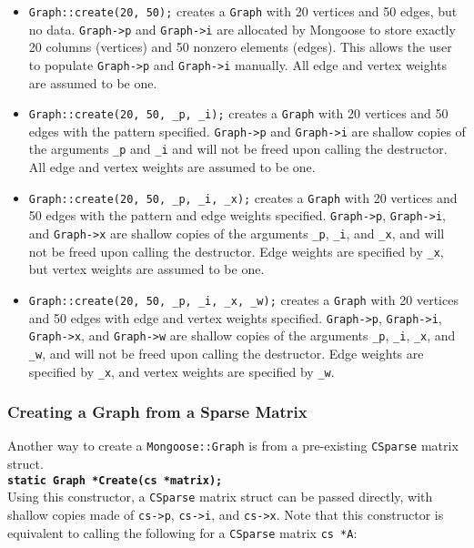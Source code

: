 \documentclass[letter]{article}
\begin{document}
\begin{itemize}
\item \texttt{Graph::create(20, 50);} creates a \texttt{Graph} with 20 vertices and 50 edges, but no data. \texttt{Graph->p} and \texttt{Graph->i} are allocated by Mongoose to store exactly 20 columns (vertices) and 50 nonzero elements (edges). This allows the user to populate \texttt{Graph->p} and \texttt{Graph->i} manually. All edge and vertex weights are assumed to be one.
\item \texttt{Graph::create(20, 50, \_p, \_i);} creates a \texttt{Graph} with 20 vertices and 50 edges with the pattern specified. \texttt{Graph->p} and \texttt{Graph->i} are shallow copies of the arguments \texttt{\_p} and \texttt{\_i} and will not be freed upon calling the destructor. All edge and vertex weights are assumed to be one.
\item \texttt{Graph::create(20, 50, \_p, \_i, \_x);} creates a \texttt{Graph} with 20 vertices and 50 edges with the pattern and edge weights specified. \texttt{Graph->p}, \texttt{Graph->i}, and \texttt{Graph->x} are shallow copies of the arguments \texttt{\_p}, \texttt{\_i}, and \texttt{\_x}, and will not be freed upon calling the destructor. Edge weights are specified by \texttt{\_x}, but vertex weights are assumed to be one.
\item \texttt{Graph::create(20, 50, \_p, \_i, \_x, \_w);} creates a \texttt{Graph} with 20 vertices and 50 edges with edge and vertex weights specified. \texttt{Graph->p}, \texttt{Graph->i}, \texttt{Graph->x}, and \texttt{Graph->w} are shallow copies of the arguments \texttt{\_p}, \texttt{\_i}, \texttt{\_x}, and \texttt{\_w}, and will not be freed upon calling the destructor. Edge weights are specified by \texttt{\_x}, and vertex weights are specified by \texttt{\_w}.
\end{itemize}


\subsubsection{Creating a Graph from a Sparse Matrix}

Another way to create a \texttt{Mongoose::Graph} is from a pre-existing \texttt{CSparse} matrix struct.\\

\textbf{\texttt{static Graph *Create(cs *matrix);}}\\

Using this constructor, a \texttt{CSparse} matrix struct can be passed directly, with shallow copies made of \texttt{cs->p}, \texttt{cs->i}, and \texttt{cs->x}. Note that  this constructor is equivalent to calling the following for a \texttt{CSparse} matrix \texttt{cs *A}:\\
\end{document}
